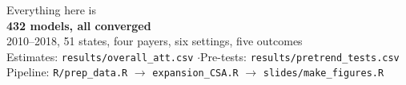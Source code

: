 \documentclass[aspectratio=169,11pt]{beamer}
\begin{document}
{
\begin{frame}[plain]
  \vfill
  \begin{center}
    {\Large\color{LightGray} Everything here is}\\[0.5cm]
    {\huge\bfseries\color{Gold} 432 models, all converged}\\[0.5cm]
    {\Large\color{LightGray} 2010--2018, 51 states, four payers, six settings, five outcomes}\\[1.2cm]
    {\footnotesize\color{WarmGray} Estimates: \texttt{results/overall\_att.csv} \quad$\cdot$\quad Pre-tests: \texttt{results/pretrend\_tests.csv}}\\[0.2cm]
    {\footnotesize\color{WarmGray} Pipeline: \texttt{R/prep\_data.R} $\rightarrow$ \texttt{expansion\_CSA.R} $\rightarrow$ \texttt{slides/make\_figures.R}}
  \end{center}
  \vfill
\end{frame}}
\end{document}
